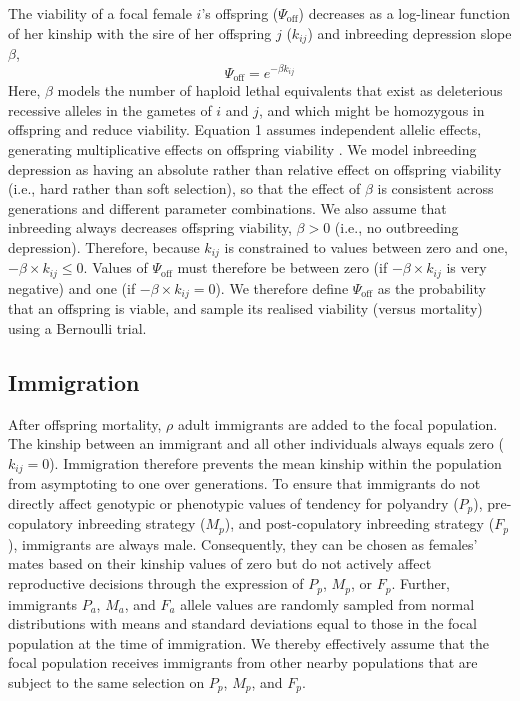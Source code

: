 \documentclass[10pt,letterpaper]{article}
\begin{document}
The viability of a focal female $i$'s offspring ($\Psi_{\textrm{off}}$) decreases as a log-linear function of her kinship with the sire of her offspring $j$ ($k_{ij}$) and inbreeding depression slope $\beta$,
\begin{equation}
\Psi_{\textrm{off}} = e^{-\beta k_{ij}}
\end{equation}
Here, $\beta$ models the number of haploid lethal equivalents that exist as deleterious recessive alleles in the gametes of $i$ and $j$, and which might be homozygous in offspring and reduce viability. Equation 1 assumes independent allelic effects, generating multiplicative effects on offspring viability \cite[][]{Morton1956, Mills1994}. We model inbreeding depression as having an absolute rather than relative effect on offspring viability (i.e., hard rather than soft selection), so that the effect of $\beta$ is consistent across generations and different parameter combinations. We also assume that inbreeding always decreases offspring viability, $\beta > 0$ (i.e., no outbreeding depression). Therefore, because $k_{ij}$ is constrained to values between zero and one, $-\beta \times k_{ij} \leq 0$. Values of $\Psi_{\textrm{off}}$ must therefore be between zero (if $-\beta \times k_{ij}$ is very negative) and one (if $-\beta \times k_{ij} = 0$). We therefore define $\Psi_{\textrm{off}}$ as the probability that an offspring is viable, and sample its realised viability (versus mortality) using a Bernoulli trial.

\subsection*{Immigration}

After offspring mortality, $\rho$ adult immigrants are added to the focal population. The kinship between an immigrant and all other individuals always equals zero ($k_{ij}=0$). Immigration therefore prevents the mean kinship within the population from asymptoting to one over generations. To ensure that immigrants do not directly affect genotypic or phenotypic values of tendency for polyandry ($P_{p}$), pre-copulatory inbreeding strategy ($M_{p}$), and post-copulatory inbreeding strategy ($F_{p}$), immigrants are always male. Consequently, they can be chosen as females' mates based on their kinship values of zero but do not actively affect reproductive decisions through the expression of $P_{p}$, $M_{p}$, or $F_{p}$. Further, immigrants $P_{a}$, $M_{a}$, and $F_{a}$ allele values are randomly sampled from normal distributions with means and standard deviations equal to those in the focal population at the time of immigration. We thereby effectively assume that the focal population receives immigrants from other nearby populations that are subject to the same selection on $P_{p}$, $M_{p}$, and $F_{p}$.
\end{document}
